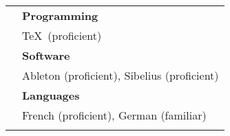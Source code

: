 \documentclass[letterpaper, 11pt]{article}
\begin{document}
\begin{longtable}{p{1.3in}p{4.8in}}
{\color{OliveGreen}{Proficiencies}} 
& \textbf{Programming} \\
& \TeX~(proficient) \\
& \textbf{Software} \\
& Ableton (proficient), Sibelius (proficient) \\
& \textbf{Languages} \\
& French (proficient), German (familiar) \\
& \\

\end{longtable}
\end{document}
